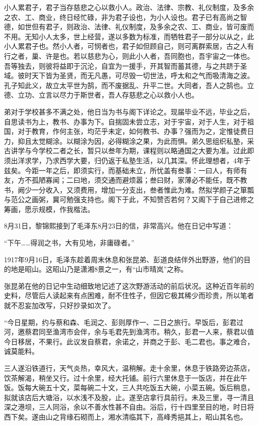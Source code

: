 \documentclass[../../dazhuan.tex]{subfiles}
\begin{document}
\begin{xquote}
小人累君子，君子当存慈悲之心以救小人。政治、法律、宗教、礼仪制度，及多余之农、工、商业，终日经忙碌，非为君子设也，为小人设也。君子已有高尚之智德，如世但有君子，则政治、法律、礼仪制度，及多余之农、工、商业，皆可废而不用。无知小人太多，世上经营，遂以多数为标准，而牺牲君子一部分以从之，此小人累君子也。然小人者，可悯者也，君子如但顾自己，则可离群索居，古之人有行之者，巢、许是也。若以慈悲为心，则此小人者，吾同胞也，吾宇宙之一体也。吾等独去，则彼将益即于沉沦，自宜为一援手，开其智而蓄其德，与之共跻于圣域。彼时天下皆为圣贤，而无凡愚，可尽毁一切世法，呼太和之气而吸清海之波。孔子知此义，故立太平世为鹄，而不废据乱、升平二世。大同者，吾人之鹄也。立德、立功、立言以尽力于斯世者，吾人存慈悲之心以救小人也。 

弟对于学校甚多不满之处，他日当为书与阁下详论之。现届毕业不远，毕业之后，自思读书为上，教书、办事为下。自揣固未尝立志，对于宇宙，对于人生，对于祖国，对于教育，作何主张，均茫乎未定，如何教书、办事？强而为之，定惟徒费日力，抑且太觉糊涂。以糊涂为因，必得糊涂之果，为此而惧。弟久思组织私塾，采古讲学与今学校二者之长，暂只以叁年为期，课程则以略通国之大要为准。过此即须出洋求学，乃求西学大要，归仍返于私塾生活，以几其深。怀此理想者，4年于兹矣。今距一年之后，即须实行，而基础未立，所忧盖有叁事：一曰人，有师有友，方不孤陋寡闻；二曰地，须交通而避烦嚣；叁曰财，家薄必不能任，既不教书，阙少一分收入，又须费用，增加一分支出，叁者惟此为难。然拟学颜子之箪瓢与范公之画粥，冀可勉强支持也。阁下于此，不知赞否若何？又阁下于自己进修之筹画，愿示规模，作我楷法。 

\end{xquote}

8月31日，黎锦熙接到了毛泽东8月23日的信，非常高兴。他在日记中写道：

“下午……得润之书，大有见地，非庸碌者。”

1917年9月16日，毛泽东趁着周末休息和张昆弟、彭道良结伴外出野游，他们的目的地是昭山。这昭山乃是潇湘8景之一，有“山市晴岚”之称。

张昆弟在他的日记中生动细致地记述了这次野游活动的前后状况。这种近百年前的史料，尽管后人读起来有点困难，耐不住性子，但因它极其稀少而珍贵，所以笔者就不忍妄加改写，只好抄录如次了。

“今日星期，约与蔡和森、毛润之、彭则厚作一、二日之旅行。早饭后，彭君过河，邀蔡君同至渔湾市会伴，余与毛君先到渔湾市。稍久，彭君一人来，蔡君以值今日移居，不果行。此议发自蔡君，余诺之，并商之于彭、毛二君也。事之难合，诚莫能料。

三人遂沿铁道行，天气炎热，幸风大，温稍解。走十余里，休息于铁路旁边茶店，饮茶解渴，稍坐又行。过十余里，经大托铺。前行六里休息于一饭店，并在此午饭。饭每大碗五十文，菜每碗二十文，三人共吃饭五大碗，小菜五碗。饭后稍息，拟就该店后大塘浴，以水浅不及股，止。遂至店拿行具前行。未及三里，寻一清且深之港坝，三人同浴，余以不善水性甚不自由。浴后，行十四里至目的地，时日将西下矣。遂由山之背缘石砌而上，湘水清临其下，高峰秀挹其上，昭山其名也。
\end{document}
